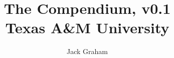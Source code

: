 \documentclass{report}
\title{
	{The Compendium, v0.1}\\
	{Texas A\&M University}
}
\author{Jack Graham}
\begin{document}
\maketitle

\tableofcontents

\chapter{}
  

%
\end{document}
